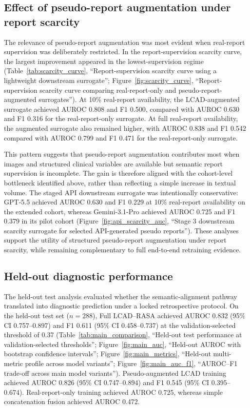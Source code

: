 \subsection{Effect of pseudo-report augmentation under report scarcity}
\label{subsec:scarcity_results}

The relevance of pseudo-report augmentation was most evident when real-report supervision was deliberately restricted. In the report-supervision scarcity curve, the largest improvement appeared in the lowest-supervision regime (Table~\ref{tab:scarcity_curve}, ``Report-supervision scarcity curve using a lightweight downstream surrogate''; Figure~\ref{fig:scarcity_curve}, ``Report-supervision scarcity curve comparing real-report-only and pseudo-report-augmented surrogates''). At 10\% real-report availability, the LCAD-augmented surrogate achieved AUROC 0.808 and F1 0.500, compared with AUROC 0.630 and F1 0.316 for the real-report-only surrogate. At full real-report availability, the augmented surrogate also remained higher, with AUROC 0.838 and F1 0.542 compared with AUROC 0.799 and F1 0.471 for the real-report-only surrogate.

This pattern suggests that pseudo-report augmentation contributes most when images and structured clinical variables are available but semantic report supervision is incomplete. The gain is therefore aligned with the cohort-level bottleneck identified above, rather than reflecting a simple increase in textual volume. The staged API downstream surrogate was intentionally conservative: GPT-5.5 achieved AUROC 0.630 and F1 0.229 at 10\% real-report availability on the extended cohort, whereas Gemini-3.1-Pro achieved AUROC 0.725 and F1 0.379 in its pilot cohort (Figure~\ref{fig:api_scarcity_auc}, ``Stage 3 downstream scarcity surrogate for selected API-generated pseudo reports''). These analyses support the utility of structured pseudo-report augmentation under report scarcity, while remaining complementary to full end-to-end retraining evidence.

\subsection{Held-out diagnostic performance}
\label{subsec:diagnostic_results}

The held-out test analysis evaluated whether the semantic-alignment pathway translated into diagnostic prediction under a locked retrospective protocol. On the held-out test set ($n=288$), Full LCAD--RASA achieved AUROC 0.832 (95\% CI 0.757--0.897) and F1 0.611 (95\% CI 0.458--0.737) at the validation-selected threshold of 0.37 (Table~\ref{tab:main_comparison}, ``Held-out test performance at validation-selected thresholds''; Figure~\ref{fig:main_auc}, ``Held-out AUROC with bootstrap confidence intervals''; Figure~\ref{fig:main_metrics}, ``Held-out multi-metric profile across model variants''; Figure~\ref{fig:main_auc_f1}, ``AUROC--F1 trade-off across main model variants''). Pseudo-augmented LCAD training achieved AUROC 0.826 (95\% CI 0.747--0.894) and F1 0.545 (95\% CI 0.395--0.674). Real-report-only training achieved AUROC 0.725, whereas simple concatenation fusion achieved AUROC 0.472.

